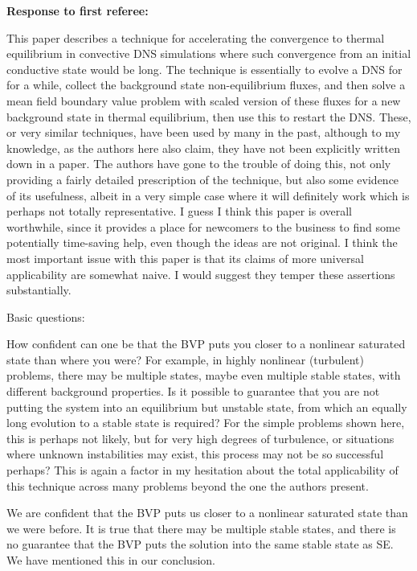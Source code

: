 \documentclass[aps, 11pt, singlecolumn]{revtex4-1} %
\begin{document}
\begin{singlespace}
\newpage
\noindent
\Large{\textbf{Response to first referee:}}\newline$\,$\newline\indent

\begin{myquotation}
This paper describes a technique for accelerating the convergence to
thermal equilibrium in convective DNS simulations where such
convergence from an initial conductive state would be long. The
technique is essentially to evolve a DNS for for a while, collect the
background state non-equilibrium fluxes, and then solve a mean field
boundary value problem with scaled version of these fluxes for a new
background state in thermal equilibrium, then use this to restart the
DNS. These, or very similar techniques, have been used by many in the
past, although to my knowledge, as the authors here also claim, they
have not been explicitly written down in a paper. The authors have
gone to the trouble of doing this, not only providing a fairly
detailed prescription of the technique, but also some evidence of its
usefulness, albeit in a very simple case where it will definitely work
which is perhaps not totally representative. I guess I think this
paper is overall worthwhile, since it provides a place for newcomers
to the business to find some potentially time-saving help, even though
the ideas are not original. I think the most important issue with this
paper is that its claims of more universal applicability are somewhat
naive. I would suggest they temper these assertions substantially.

Basic questions:

How confident can one be that the BVP puts you closer to a nonlinear
saturated state than where you were? For example, in highly nonlinear
(turbulent) problems, there may be multiple states, maybe even
multiple stable states, with different background properties. Is it
possible to guarantee that you are not putting the system into an
equilibrium but unstable state, from which an equally long evolution
to a stable state is required? For the simple problems shown here,
this is perhaps not likely, but for very high degrees of turbulence,
or situations where unknown instabilities may exist, this process may
not be so successful perhaps? This is again a factor in my hesitation
about the total applicability of this technique across many problems
beyond the one the authors present.
\end{myquotation}
We are confident that the BVP puts us closer to a nonlinear saturated state
than we were before. It is true that there may be multiple stable states, and there
is no guarantee that the BVP puts the solution into the same stable state as
SE. We have mentioned this in our conclusion.


\end{singlespace}
\end{document}
